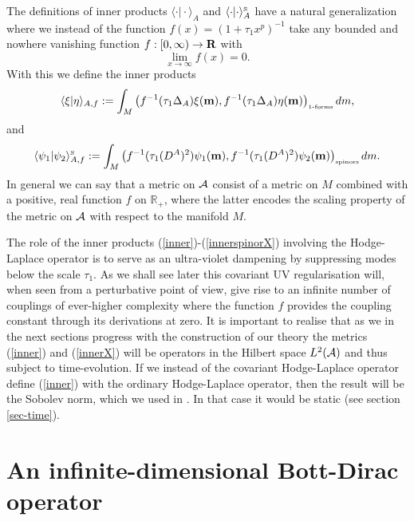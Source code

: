 \documentclass[letterpaper,11pt]{article}
\def\ca{{\cal A}}
\newcommand{\R}{\operatorname{\bold R}}
\begin{document}
The definitions of inner products $\langle \cdot \vert \cdot \rangle_{A}$ and $\langle \cdot \vert \cdot \rangle_{A}^{\mbox{\tiny S}}$ have a natural generalization where we instead of the function $f(x)=( 1+ \tau_1 x^p)^{-1}$ take any bounded and nowhere vanishing   function $f:[0, \infty) \to \R$ with 
$$
\lim_{x\to \infty} f(x)=0.
$$ 
With this we define the inner products
\begin{equation}
\langle \xi \vert \eta \rangle_{A,f} := \int_M \left(  f^{-1}(\tau_1 \Delta_A) \xi({\bf m})         , f^{-1}(\tau_1 \Delta_A) \eta({\bf m})   \right)_{\mbox{\tiny 1-forms}}       dm,
\label{innerX}
\end{equation}
and 
\begin{equation}
\langle \psi_1 \vert \psi_2 \rangle_{A,f}^{\mbox{\tiny S}} := \int_M \left(  f^{-1}(\tau_1 (D^A)^2) \psi_1({\bf m})         ,  f^{-1}(\tau_1 (D^A)^2) \psi_2({\bf m})   \right)_{\mbox{\tiny spinors}}        dm.
\label{innerspinorX}
\end{equation}
In general we can say that a metric on $\ca$ consist of a metric on $M$ combined with a positive, real function $f$ on $\mathbb{R}_+$, where the latter encodes the scaling property of the metric on $\ca$ with respect to the manifold $M$. 



 

The role of the inner products (\ref{inner})-(\ref{innerspinorX}) involving the Hodge-Laplace operator is to serve as an ultra-violet dampening by suppressing modes below the scale $\tau_1$. As we shall see later this covariant UV regularisation will, when seen from a perturbative point of view, give rise to an infinite number of couplings of ever-higher complexity where the function $f$ provides the coupling constant through its derivations at zero.
It is important to realise that as we in the next sections progress with the construction of our theory the metrics (\ref{inner}) and (\ref{innerX}) will be operators in the Hilbert space $L^{2}(\ca)$ and thus subject to time-evolution. 
If we instead of the covariant Hodge-Laplace operator define  (\ref{inner}) with the ordinary Hodge-Laplace operator, then the result will be the Sobolev norm, which we used in \cite{Aastrup:2017vrm}.
In that case it would be static (see section \ref{sec-time}).







\section{An infinite-dimensional Bott-Dirac operator}
\end{document}
